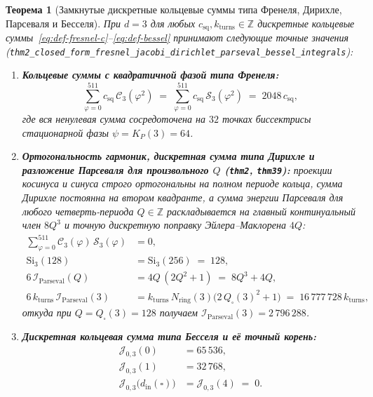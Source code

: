 \documentclass[11pt,a4paper]{article}
\theoremstyle{plain}
\newtheorem{theorem}{Теорема}[section]
\theoremstyle{definition}
\begin{document}
\begin{theorem}[Замкнутые дискретные кольцевые суммы типа Френеля, Дирихле, Парсеваля и Бесселя]
\label{thm:main-2b}
При $d = 3$ для любых $c_{\mathrm{sq}}, k_{\mathrm{turns}} \in \mathbb{Z}$ дискретные кольцевые суммы~\eqref{eq:def-fresnel-c}--\eqref{eq:def-bessel} принимают следующие точные значения (\texttt{thm2\_closed\_form\_fresnel\_jacobi\_dirichlet\_parseval\_bessel\_integrals}):
\begin{enumerate}[label=\textbf{(\roman*)},leftmargin=*]
\item \textbf{Кольцевые суммы с квадратичной фазой типа Френеля:}
  \begin{equation}
    \label{eq:fresnel-closed}
    \sum_{\varphi=0}^{511} c_{\mathrm{sq}}\,\mathcal{C}_3(\varphi^2) \;=\; \sum_{\varphi=0}^{511} c_{\mathrm{sq}}\,\mathcal{S}_3(\varphi^2) \;=\; 2048\,c_{\mathrm{sq}},
  \end{equation}
  где вся ненулевая сумма сосредоточена на $32$ точках биссектрисы стационарной фазы $\psi = K_P(3) = 64$.
\item \textbf{Ортогональность гармоник, дискретная сумма типа Дирихле и разложение Парсеваля для произвольного $Q$ (\texttt{thm2}, \texttt{thm39}):}
  проекции косинуса и синуса строго ортогональны на полном периоде кольца, сумма Дирихле постоянна на втором квадранте, а сумма энергии Парсеваля для любого четверть-периода $Q \in \mathbb{Z}$ раскладывается на главный континуальный член $8Q^3$ и точную дискретную поправку Эйлера--Маклорена $4Q$:
  \begin{align}
    \sum_{\varphi=0}^{511} \mathcal{C}_3(\varphi)\,\mathcal{S}_3(\varphi) &= 0, \label{eq:ortho-cs-zero} \\
    \mathrm{Si}_3(128) &= \mathrm{Si}_3(256) \;=\; 128, \label{eq:dirichlet-closed} \\
    6\,\mathcal{I}_{\mathrm{Parseval}}(Q) &= 4Q\,(2Q^2 + 1) \;=\; 8Q^3 + 4Q, \label{eq:parseval-general-q} \\
    6\,k_{\mathrm{turns}}\,\mathcal{I}_{\mathrm{Parseval}}(3) &= k_{\mathrm{turns}}\,N_{\mathrm{ring}}(3)\bigl(2\,Q_\square(3)^2 + 1\bigr) \;=\; 16\,777\,728\,k_{\mathrm{turns}}, \label{eq:parseval-closed}
  \end{align}
  откуда при $Q = Q_\square(3) = 128$ получаем $\mathcal{I}_{\mathrm{Parseval}}(3) = 2\,796\,288$.
\item \textbf{Дискретная кольцевая сумма типа Бесселя и её точный корень:}
  \begin{align}
    \mathcal{J}_{0,3}(0) &= 65\,536, \label{eq:bessel-k0} \\
    \mathcal{J}_{0,3}(1) &= 32\,768, \label{eq:bessel-k1} \\
    \mathcal{J}_{0,3}\bigl(d_{\mathrm{in}}(\square)\bigr) &= \mathcal{J}_{0,3}(4) \;=\; 0. \label{eq:bessel-k4}
  \end{align}
\end{enumerate}
\end{theorem}
\end{document}
